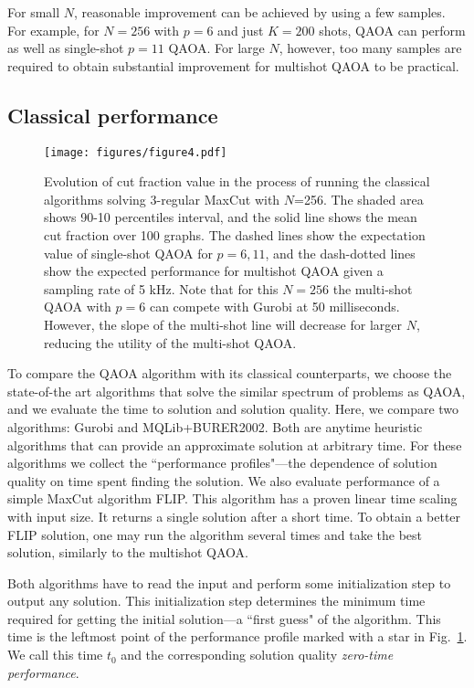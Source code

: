 For small $N$, reasonable improvement can be achieved by using a few samples. For example, for $N=256$ with $p=6$ and just $K=200$ shots, QAOA can perform as well as single-shot $p=11$ QAOA. For large $N$, however, too many samples are required to obtain substantial improvement for multishot QAOA to be practical.



\subsection{Classical performance}\label{sec:classicalperformance}

\begin{figure}
    \centering
    \texttt{[image: figures/figure4.pdf]}
    \caption{
    Evolution of cut fraction value in the process of running the classical algorithms solving 3-regular MaxCut with $N$=256. The shaded area shows 90-10 percentiles interval, 
    and the solid line shows the mean cut fraction over 100 graphs.
    The dashed lines show the expectation value of single-shot QAOA for $p=6, 11$, and
    the dash-dotted lines show the expected performance for multishot QAOA given a sampling rate of 5 kHz.
    Note that for this $N=256$ the multi-shot QAOA with $p=6$ can compete with Gurobi
    at 50 milliseconds. However, the slope of the multi-shot line will decrease for larger $N$, reducing the utility of the multi-shot QAOA. 
    }
    \label{fig:timebounds}
\end{figure}


To compare the QAOA algorithm with its classical counterparts, we choose the state-of-the art algorithms that solve the similar spectrum of problems as QAOA, and we  evaluate the time to solution and solution quality. Here, we compare  two algorithms: Gurobi and MQLib+BURER2002. 
Both are anytime heuristic algorithms that can provide an approximate solution at arbitrary time. For these algorithms we 
collect the ``performance profiles"---the dependence of solution quality on time spent  finding the solution.
We also evaluate performance of a simple MaxCut algorithm FLIP. This algorithm has a proven linear time scaling with input size. It returns a single solution after a short time. To obtain a better FLIP solution, one may run the algorithm several times and take the best solution, similarly to the multishot QAOA.

Both algorithms have to read the input and perform some initialization step to output any solution. This initialization step determines the minimum time required for getting the initial 
solution---a ``first guess" of the algorithm. This time is the leftmost point of the performance profile marked with a star in Fig.~\ref{fig:timebounds}. 
We call this time $t_0$ and the corresponding solution quality \emph{zero-time performance}.


